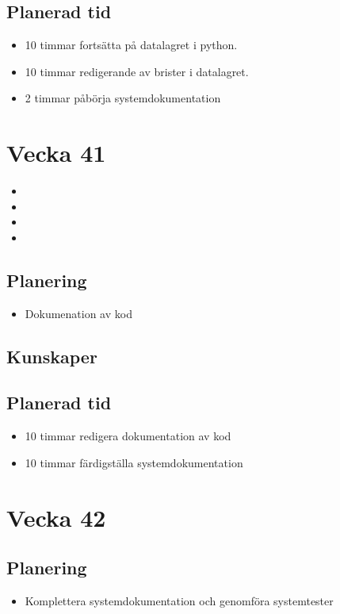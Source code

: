\documentclass{TDP003mall}
\begin{document}
\subsection{Planerad tid}
\begin{itemize}
\item 10 timmar fortsätta på datalagret i python.
\item 10 timmar redigerande av brister i datalagret.
\item  2 timmar påbörja systemdokumentation
\end{itemize}


\section{Vecka 41}
\begin{itemize}
\item
\item
\item  
\item
\end{itemize}

\subsection{Planering}
\begin{itemize}
\item Dokumenation av kod
\end{itemize}

\subsection{Kunskaper}

\subsection{Planerad tid}
\begin{itemize}
\item 10 timmar redigera dokumentation av kod 
\item 10 timmar färdigställa systemdokumentation 
\end{itemize}



\section{Vecka 42}


\subsection{Planering}
\begin{itemize}
\item Komplettera systemdokumentation och genomföra systemtester
\end{itemize}
\end{document}
